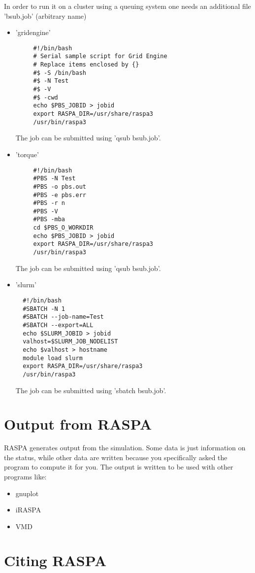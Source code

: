 In order to run it on a cluster using a queuing system one needs an additional file 'bsub.job' (arbitrary name)
\begin{itemize}
 \item{'gridengine'}
  \begin{verbatim}
     #!/bin/bash
     # Serial sample script for Grid Engine
     # Replace items enclosed by {}
     #$ -S /bin/bash
     #$ -N Test
     #$ -V
     #$ -cwd
     echo $PBS_JOBID > jobid
     export RASPA_DIR=/usr/share/raspa3
     /usr/bin/raspa3
  \end{verbatim}
The job can be submitted using 'qsub bsub.job'.
 \item{'torque'}
  \begin{verbatim}
     #!/bin/bash
     #PBS -N Test
     #PBS -o pbs.out
     #PBS -e pbs.err
     #PBS -r n
     #PBS -V
     #PBS -mba
     cd $PBS_O_WORKDIR
     echo $PBS_JOBID > jobid
     export RASPA_DIR=/usr/share/raspa3
     /usr/bin/raspa3
  \end{verbatim}
The job can be submitted using 'qsub bsub.job'.
 \item{'slurm'}
\begin{verbatim}
  #!/bin/bash 
  #SBATCH -N 1
  #SBATCH --job-name=Test
  #SBATCH --export=ALL
  echo $SLURM_JOBID > jobid
  valhost=$SLURM_JOB_NODELIST
  echo $valhost > hostname
  module load slurm
  export RASPA_DIR=/usr/share/raspa3
  /usr/bin/raspa3
\end{verbatim}
The job can be submitted using 'sbatch bsub.job'.
\end{itemize}


\section{Output from RASPA}
RASPA generates output from the simulation. Some data is just information on the status, while other data are written because you
specifically asked the program to compute it for you. The output is written to be used with other programs like:
\begin{itemize}
 \item{gnuplot}
 \item{iRASPA}
 \item{VMD}
\end{itemize}

\section{Citing RASPA}

